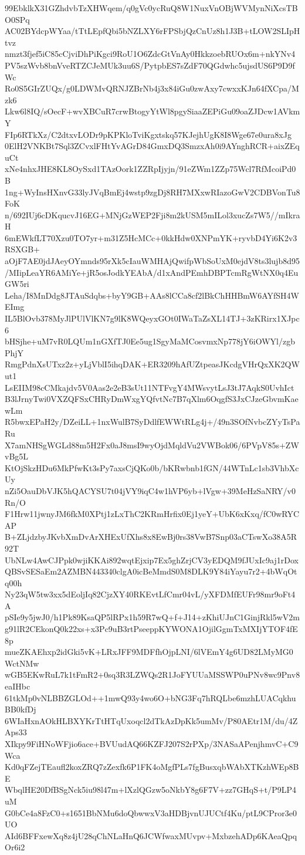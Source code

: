 99EbklkX31GZhdvbTzXHWqem/q0gVc0ycRuQ8W1NuxVnOBjWVMynNiXcsTBO0SPq
AC02BYdcpWYaa/tTtLEpfQbi5bNZLXY6rFPSbjQzCnUz8h1J3B+tLOW2SLIpHtvz
nmzt3fjef5iC85cCjviDhPiKgci9RoU1O6ZdcGtVnAy0HkkzoebRUOx6m+nkYNv4
PV5szWvb8bnVveRTZCJeMUk3uu6S/PytpbES7sZdF70QGdwhc5ujsdUS6P9D9fWc
Ro0S5GIrZUQx/g0LDWMvQRNJZBrNb4j3x84iGu0zwAxy7cwxxKJn64fXCpa/Mzk6
Lkw6l8IQ/sOecF+wvXBCuR7crwBtogyYtWl8pgySiaaZEPiGu09oaZJDcw1AVkmY
FIp6RTkXz/C2dtxvLODr9pKPKloTviKgxtskq57KJejhUgK8I8Wge67e0ura8xJg
0ElH2VNKBt7Sql3ZCvxlFHtYvAGrD84GmxDQ3SmzxAh0i9AYnghRCR+aixZEquCt
xNe4nhxJHE8KL8OySxd1TAzOork1ZZRpIjyjn/91eZWm1ZZp75Wcl7RfMcoiPd0B
1ng+WyInsHXnvG33lyJVqBmEj4wstp9zgDj8RH7MXxwRIazoGwV2CDBVonTu8FoK
n/692IUj6cDKqucvJ16EG+MNjGzWEP2Fji8m2kUSM5mILol3xucZs7W5//mIkraH
6mEWkfLT70Xzu0TO7yr+m31Z5HcMCc+0kkHdw0XNPmYK+ryvbD4Yi6K2v3RSXGB+
aOjF7AE0jdJAeyOYmnds95rXk5cIauWMHAjQwifpWbSoUxM0ejdV8ts3lujb8d95
/MIipLeaYR6AMiYe+jR5osJodkYEAbA/d1xAndPEmhDBPTcmRgWtNX0q4EuGW5ri
Leha/I8MnDdg8JTAuSdqbs+byY9GB+AAs8lCCa8cf2lBkChHHBmW6AYfSH4WEImg
IL5BlOvb378MyJlPUlVlKN7g9lK8WQeyxGOt0IWaTaZsXL14TJ+3zKRirx1XJpc6
bHSjhe+uM7vR0LQUm1nGXfTJ0Ee5ug1SgyMaMCosvmxNp778jY6iOWYl/zgbPhjY
RmgPdnXsUTxz2z+yLjVblI5ihqDAK+ER3209hAfUZtpeasJKcdgVHrQxXK2QWut1
LsEIIM98cCMkajdv5V0Aas2e2eB3sUt11NTFvgY4MWsvytLsJ3tJ7AqkS0UvhIct
B3lJrnyTwi0VXZQFSxCHRyDmWxgYQfvtNc7B7qXlm6OqgfS3JxCJzeGbvmKaewLm
R5bwxEPaH2y/DZeiLL+1nxWulB7SyDdlfEWWtRLg4j+/49n3SOfNvbcZYyTsPaRu
X7amNHSgWGLd88m5H2Fx0aJ8msI9wyOjdMqldVu2VWBok06/6PVpV85s+ZWvBg5L
KtOjSkzHDu6MkPfwKt3sPy7axsCjQKo0b/bKRwbnb1fGN/44WTnLc1sb3VhbXcUy
nZi5OauDbVJK5hQACYSU7t04jVY9iqC4w1hVP6yb+lVgw+39MeHzSaNRY/v0Rn/O
F1Hrw11jwnyJM6fkM0XPtj1zLxThC2KRmHrfix0Ej1yeY+UbK6xKxq/fC0wRYCAP
B+ZLjdzbyJKvbXmDvArXHExUfXhs8x8EwBj0rs38VwB7Snp03aCTswXo38A5R92T
UbNLw4AwCJPpk0wjiKKAi892wqtEjxip7Ex5ghZrjCV3yEDQM9fJUxIc9aj1rDox
QBSvSESaEm2AZMBN443340clgA0icBeMmdS0M8DLK9Y84iYayu7r2+4bWqOtq00h
Ny23qW5tw3xx5dEoljIq82CjzXY40RKEvtLfCmr04vL/yXFDMfEUFr98mr9oFt4A
pSIe9y5jwJ0/h1Pk89KsaQP5lRPx1h59R7wQ+f+J14+zKhiUJnC1GinjRkl5wV2m
g91lR2CEkonQ0k22xs+x3Pc9uB3rtPseeppKYWONA1OjilGgmTxMXIjYTOF4fE8p
mueZKAEhxp2idGki5vK+LRxJFF9MDFfhOjpLNI/6lVEmY4g6UD82LMyMG0WctNMw
wGB5EKwRuL7k1tFmR2+0sq3R3LZWQs2R1JoFYUUaMSSWP0uPNv8wc9Pnv8eaIHbc
61tkMp0vNLBBZGLOd++1mwQ93y4wo6O+bNG3Fq7hRQLbe6mzhLUACqkhuBB0kfDj
6WIaHxnAOkHLBXYKrTtHTqUxoqcl2dTkAzDpKk5umMv/P80AEtr1M/du/4ZAps33
XIkpy9FiHNoWFjio6ace+BVUudAQ66KZFJ207S2rPXp/3NASaAPenjhmvC+C9Wca
Kd0qFZejTEaufl2koxZRQ7zZexfk6P1FK4oMgfPLs7fgBusxqbWAbXTKzhWEp8BE
WbqlHE20DfBSgNck5iu98l47m+lXzlQGzw5oNkbY8g6F7V+zz7GHqS+t/P9LP4uM
G0bCe4a8FzC0+s1651BbNMu6doQbwwxV3aHDBjvnUJUCtf4Ku/ptL9CPror3e0UO
AId6BFFxewXq8z4jU28qChNLaHnQ6JCWfwaxMUvpv+MxbzehADp6KAeaQpqOr6i2
